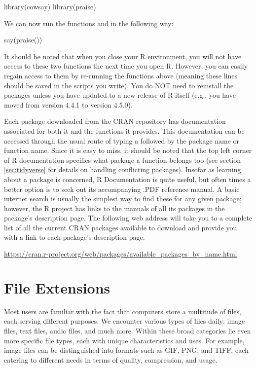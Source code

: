 \begin{inR}
library(cowsay)
library(praise)
\end{inR}
\medskip

\noindent
We can now run the functions  and  in the following way: 

\begin{inR}
say(praise())
\end{inR}
\medskip

It should be noted that when you close your R environment, you will not have access to these two functions the next time you open R.  However, you can easily regain access to them by re-running the  functions above (meaning these lines should be saved in the scripts you write).  You do NOT need to reinstall the packages unless you have updated to a new release of R itself (e.g., you have moved from version 4.4.1 to version 4.5.0).

Each package downloaded from the CRAN repository has documentation associated for both it and the functions it provides.  This documentation can be accessed through the usual route of typing a  followed by the package name or function name.  Since it is easy to miss, it should be noted that the top left corner of R documentation specifies what package a function belongs too (see section \ref{sec:tidyverse} for details on handling conflicting packages). Insofar as learning about a package is concerned, R Documentation is quite useful, but often times a better option is to seek out its accompanying .PDF reference manual.  A basic internet search is usually the simplest way to find these for any given package; however, the R project has links to the manuals of all its packages in the package's description page. The following web address will take you to a complete list of all the current CRAN packages available to download and provide you with a link to each package's description page.

\begin{center}
\url{https://cran.r-project.org/web/packages/available_packages_by_name.html}
\end{center}

\section{File Extensions}

Most users are familiar with the fact that computers store a multitude of files, each serving different purposes. We encounter various types of files daily: image files, text files, audio files, and much more. Within these broad categories lie even more specific file types, each with unique characteristics and uses. For example, image files can be distinguished into formats such as GIF, PNG, and TIFF, each catering to different needs in terms of quality, compression, and usage.

